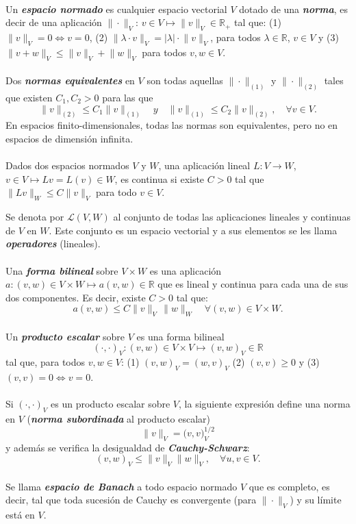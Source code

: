 \documentclass[11pt]{article}
\theoremstyle{plain}
\theoremstyle{definition}
\newcounter{stepnum}[section]
\newcommand{\step}[1][]{\bigskip\noindent\textbf{\thesection.\refstepcounter{stepnum}\thestepnum}.\enspace{#1}}
\renewcommand{\step}[1][]{\paragraph{#1}\hspace{-1.1em}}
\newcommand{\deff}[1]{\textit{\textbf{#1}}}
\newcommand{\R}{\ensuremath{\mathbb{R}}}
\newcommand{\norm}[2][]{\ensuremath{\|#2\|_{#1}}}
\begin{document}
\step 
Un \deff{espacio normado} es cualquier  espacio vectorial $V$ dotado de una \deff{norma}, es decir de una aplicación $\norm[V]{\cdot}$: $v\in V \longmapsto \norm[V]{v}\in\R_+$ tal que: (1) $\norm[V]{v}=0 \Leftrightarrow v=0$, (2) $\norm[V]{\lambda \cdot v}=|\lambda|\cdot\norm[V]{v}$, para todos $\lambda\in\R$, $v\in V$ y (3) $\norm[V]{v+w}\le \norm[V]{v}+\norm[V]{w}$  para todos $v, w\in V$.

\step Dos \deff{normas equivalentes} en $V$ son todas aquellas $\norm[(1)]{\cdot}$ y  $\norm[(2)]{\cdot}$ tales que existen $C_1, C_2>0$ para las que
\[
  \norm[(2)]{v} \le C_1\norm[(1)]{v} \quad{y}\quad \norm[(1)]{v} \le C_2\norm[(2)]{v}, \quad \forall v\in V.
\]
En espacios finito-dimensionales, todas las normas son equivalentes, pero no en espacios de dimensión infinita.

\step Dados dos espacios normados $V$ y $W$, una aplicación lineal $L:V\to W$, $v\in V\mapsto Lv=L(v)\in W$, es continua si existe $C>0$ tal que $\norm[W]{Lv} \le C \norm[V]{v}$ para todo $v\in V$.

Se denota por $\mathcal{L}(V,W)$ al conjunto de todas las aplicaciones lineales y continuas de $V$ en $W$. Este conjunto es un espacio vectorial y a sus elementos se les llama \deff{operadores} (lineales).

\step Una \deff{forma bilineal} sobre $V\times W$ es una aplicación $a:(v,w)\in V\times W \mapsto a(v,w)\in\R$ que es lineal y continua para cada una de sus dos componentes. Es decir, existe $C>0$ tal que:
\[
  a(v,w) \le C \norm[V]{v}\,\norm[W]{w} \quad\forall (v,w)\in V\times W.
\]

\step Un \deff{producto escalar} sobre $V$ es una forma bilineal 
\[
  (\cdot,\cdot)_V: (v,w)\in V\times V \longmapsto (v,w)_V\in\R
\]
tal que, para todos $v,w\in V$: (1) $(v,w)_V=(w,v)_V$  (2) $(v,v)\ge 0$ y (3) $(v,v)=0 \Leftrightarrow v=0$.


\step 
  Si $(\cdot,\cdot)_V$ es un producto escalar sobre $V$, la siguiente expresión define una norma en $V$ (\deff{norma subordinada} al producto escalar) 
  \[
    \norm[V]{v} = \big(v,v)_V^{1/2}
  \]
y además se verifica la desigualdad de \textit{\textbf{Cauchy-Schwarz}}:
  \begin{equation}
    (v,w)_V \le \norm[V]{v}\norm[V]{w}, \quad \forall u, v \in V.
  \end{equation}

\step 
Se llama \deff{espacio de Banach} a todo espacio normado $V$ que es completo, es decir, tal que toda sucesión de Cauchy es convergente (para $\norm[V]{\cdot}$) y su límite está en $V$.
\end{document}
